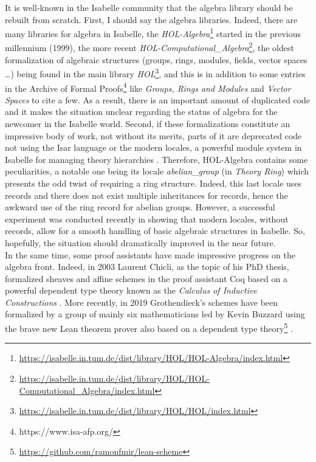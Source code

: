 \documentclass[12pt]{scrartcl}
\begin{document}
It is well-known in the Isabelle community that the algebra library should be rebuilt from scratch. First, I should say the algebra libraries. Indeed, there are many libraries for algebra in Isabelle, the \textit{HOL-Algebra}\footnote{\url{https://isabelle.in.tum.de/dist/library/HOL/HOL-Algebra/index.html}} started in the previous millennium (1999), the more recent \textit{HOL-Computational\_Algebra}\footnote{\url{https://isabelle.in.tum.de/dist/library/HOL/HOL-Computational_Algebra/index.html}}, the oldest formalization of algebraic structures (groups, rings, modules, fields, vector spaces \dots) being found in the main library \textit{HOL}\footnote{\url{https://isabelle.in.tum.de/dist/library/HOL/HOL/index.html}}, and this is in addition to some entries in the Archive of Formal Proofs\footnote{https://www.isa-afp.org/} like \textit{Groups, Rings and Modules} \cite{Group-Ring-Module-AFP} and \textit{Vector Spaces} \cite{VectorSpace-AFP} to cite a few. As a result, there is an important amount of duplicated code and it makes the situation unclear regarding the status of algebra for the newcomer in the Isabelle world. Second, if these formalizations constitute an impressive body of work, not without its merits, parts of it are deprecated code not using the Isar language or the modern locales, a powerful module system in Isabelle for managing theory hierarchies \cite{ballarin2014}. Therefore, HOL-Algebra contains some peculiarities, a notable one being its locale \emph{abelian\_group} (in \textit{Theory Ring}) which presents the odd twist of requiring a ring structure. Indeed, this last locale uses records and there does not exist multiple inheritances for records, hence the awkward use of the ring record for abelian groups. However, a successful experiment was conducted recently in \cite{ballarin20} showing that modern locales, without records, allow for a smooth handling of basic algebraic structures in Isabelle. So, hopefully, the situation should dramatically improved in the near future. \\
In the same time, some proof assistants have made impressive progress on the algebra front. Indeed, in 2003 Laurent Chicli, as the topic of his PhD thesis, formalized sheaves and affine schemes in the proof assistant Coq based on a powerful dependent type theory known as the \emph{Calculus of Inductive Constructions} \cite{chiclithesis}. More recently, in 2019 Grothendieck's schemes \cite{GrothendieckEGAI} have been formalized by a group of mainly six mathematicians led by Kevin Buzzard using the brave new Lean theorem prover also based on a dependent type theory\footnote{\url{https://github.com/ramonfmir/lean-scheme}} \cite{schemesinLean}. \\
\end{document}
